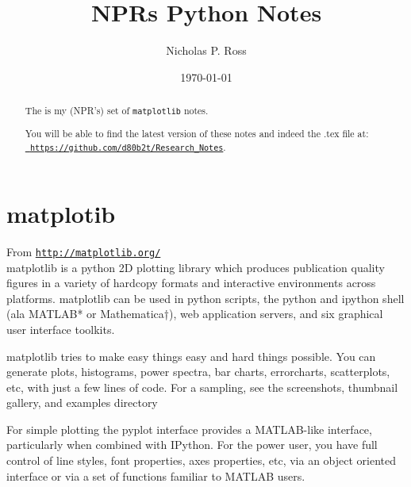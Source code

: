 \documentclass[11pt,a4paper]{article}
\begin{document}
\title{NPRs Python Notes}
\author{Nicholas P. Ross}
\date{\today}
\maketitle




\begin{abstract}
The is my (NPR's) set of {\tt matplotlib} notes.  

You will be able to find the latest version of these notes
and indeed the .tex file at:\\
\href{https://github.com/d80b2t/Research\_Notes}{\tt
https://github.com/d80b2t/Research\_Notes}.
\end{abstract}


\newpage
\section{matplotib}
From \href{http://matplotlib.org/}{{\tt http://matplotlib.org/}} \\

\noindent
matplotlib is a python 2D plotting library which produces publication
quality figures in a variety of hardcopy formats and interactive
environments across platforms. matplotlib can be used in python
scripts, the python and ipython shell (ala MATLAB* or Mathematica†),
web application servers, and six graphical user interface toolkits.

matplotlib tries to make easy things easy and hard things
possible. You can generate plots, histograms, power spectra, bar
charts, errorcharts, scatterplots, etc, with just a few lines of
code. For a sampling, see the screenshots, thumbnail gallery, and
examples directory

For simple plotting the pyplot interface provides a MATLAB-like
interface, particularly when combined with IPython. For the power
user, you have full control of line styles, font properties, axes
properties, etc, via an object oriented interface or via a set of
functions familiar to MATLAB users.\\
\end{document}
